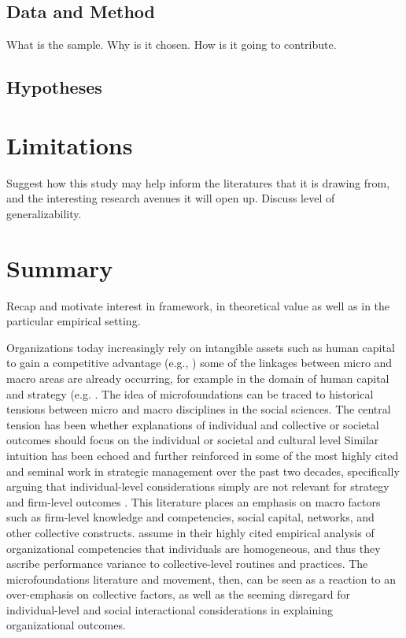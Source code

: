\documentclass[12pt,letterpaper]{article}
\begin{document}
\subsection{Data and Method}
What is the sample. Why is it chosen. How is it going to contribute.

\subsection{Hypotheses}

\section{Limitations}
Suggest how this study may help inform the literatures that it is drawing from, and the interesting research avenues it will open up. Discuss level of generalizability.

\section{Summary}
Recap and motivate interest in framework, in theoretical value as well as in the particular empirical setting.








Organizations today increasingly rely on intangible assets such as human capital to gain a competitive advantage (e.g., \cite{Barney1991})
some of the linkages between micro and macro areas are already occurring, for example in the domain of human capital and strategy (e.g. \cite{Coff2011, Ployhart2011}. The idea of microfoundations can be traced to historical tensions between micro and macro disciplines in the social sciences. The central tension has been whether explanations of individual and collective or societal outcomes should focus on the individual or societal and cultural level \citep{Udehn2001}
Similar intuition has been echoed and further reinforced in some of the most highly cited and seminal work in strategic management over the past two decades, specifically arguing that individual-level considerations simply are not relevant for strategy and firm-level outcomes \citep{Henderson1994, Kogut1992, Kogut1996, Nahapiet1998, Spender1996}. This literature places an emphasis on macro factors such as firm-level knowledge and competencies, social capital, networks, and other collective constructs. \citep{Henderson1994} assume in their highly cited empirical analysis of organizational competencies that individuals are homogeneous, and thus they ascribe performance variance to collective-level routines and practices. The microfoundations literature and movement, then, can be seen as a reaction to an over-emphasis on collective factors, as well as the seeming disregard for individual-level and social interactional considerations in explaining organizational outcomes.
\end{document}
